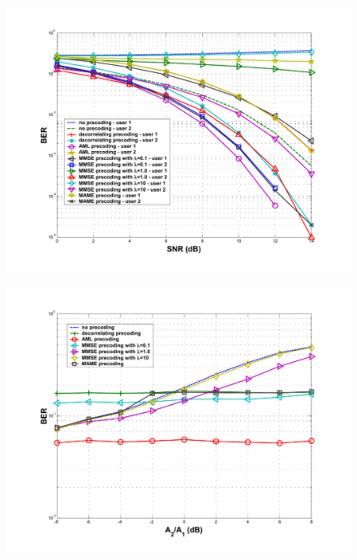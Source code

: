 \documentclass[20pt,landscape]{foils}
\begin{document}
\begin{figure}
\begin{center}
\includegraphics[width=7.0in]{Linear_BER.pdf}
\end{center}
\end{figure}


\begin{figure}
\begin{center}
\includegraphics[width=7.0in]{Linear_NFR.pdf}
\end{center}
\end{figure}
\end{document}
